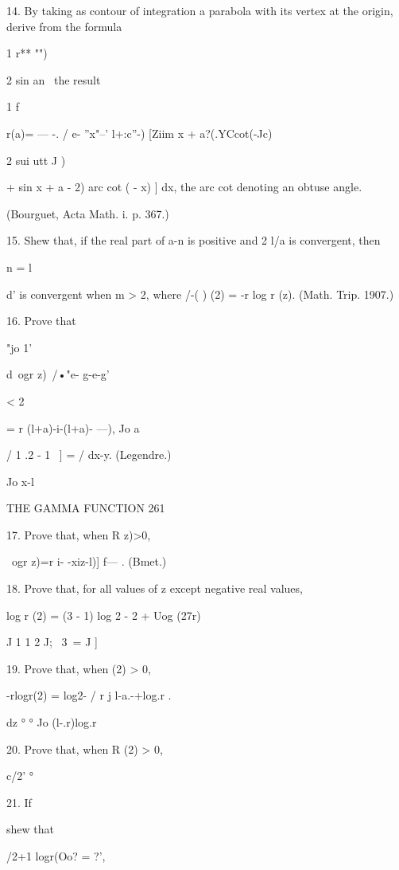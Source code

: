 14. By taking as contour of integration a parabola with its vertex at
the origin, derive from the formula

1 r** "")



2 sin an \ the result

1 f

r(a)= — -. / e- ''x"--' l+:c''-) [Ziim x + a?(.YCcot(-Jc)

2 sui utt J )

+ sin x + a - 2) arc cot ( - x) ] dx, the arc cot denoting an obtuse
angle.

(Bourguet, Acta Math. i. p. 367.)

15. Shew that, if the real part of a-n is positive and 2 l/a is
convergent, then

n = l

d' is convergent when m > 2, where \//-( ) (2) = -r log r (z). (Math.
Trip. 1907.)

16. Prove that

"jo 1'



d\ ogr z)\ /•"e- g-e-g'

< 2



= r (l+a)-i-(l+a)- ---), Jo a

/ 1 .2 - 1 \ ] = / dx-y. (Legendre.)

Jo x-l



THE GAMMA FUNCTION 261

17. Prove that, when R z)>0,

\ ogr z)=r i- -xiz-l)] f— . (Bmet.)

18. Prove that, for all values of z except negative real values,

log r (2) = (3 - 1) log 2 - 2 + Uog (27r)

J 1 1 2 J; \ 3\ = J ]

19. Prove that, when (2) > 0,

-rlogr(2) = log2- / r j l-a.-+log.r .

dz ° ° Jo (l-.r)log.r

20. Prove that, when R (2) > 0,



c/2' °



21. If

shew that



/2+1 logr(Oo? = ?',






